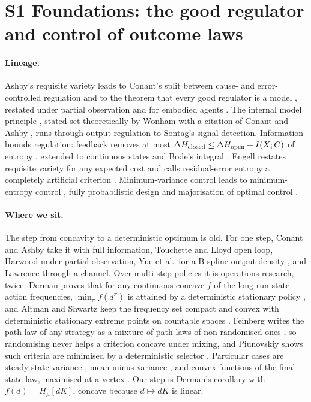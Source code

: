 \documentclass[10pt]{article}
\newcommand{\dpi}{d^\pi}
\begin{document}
\section{S1 Foundations: the good regulator and control of outcome laws}

\paragraph{Lineage.}
Ashby's requisite variety \citep{Ashby-introduction56} leads to Conant's split between cause- and error-controlled regulation \citep{Conant-information69} and to the theorem that every good regulator is a model \citep{Conant-good70}, restated under partial observation \citep{Wentworth-fixing21,Harwood-generalization25} and for embodied agents \citep{Virgo-good25}. The internal model principle \citep{Francis-internal76}, stated set-theoretically by Wonham with a citation of Conant and Ashby \citep{Wonham-towards76}, runs through output regulation to Sontag's signal detection. Information bounds regulation: feedback removes at most $\Delta H_{\rm closed}\le\Delta H_{\rm open}+I(X;C)$ of entropy \citep{Touchette-information00}, extended to continuous states \citep{Delvenne-towards13} and Bode's integral \citep{Martins-feedback08,Zhang-bode03}. Engell restates requisite variety for any expected cost and calls residual-error entropy a completely artificial criterion \citep{Engell-information85}. Minimum-variance control leads to minimum-entropy control \citep{Wang-minimum02}, fully probabilistic design \citep{Karny-fully06} and majorisation of optimal control \citep{Lefebvre-probabilistic24}.

\paragraph{Where we sit.}
The step from concavity to a deterministic optimum is old. For one step, Conant and Ashby take it with full information, Touchette and Lloyd open loop, Harwood under partial observation, Yue et al.\ for a B-spline output density \citep{Yue-minimum06}, and Lawrence through a channel. Over multi-step policies it is operations research, twice. Derman proves that for any continuous concave $f$ of the long-run state--action frequencies, $\min_\pi f(\dpi)$ is attained by a deterministic stationary policy \citep{Derman-finite70ch7}, and Altman and Shwartz keep the frequency set compact and convex with deterministic stationary extreme points on countable spaces \citep[Thm.~5.1]{Altman-markov91}. Feinberg writes the path law of any strategy as a mixture of path laws of non-randomised ones \citep[Thm.~1]{Feinberg-nonrandomized82}, so randomising never helps a criterion concave under mixing, and Piunovskiy shows such criteria are minimised by a deterministic selector \citep{Piunovskiy-controlled98}. Particular cases are steady-state variance \citep{Kawai-variance87,Sobel-meanvariance94,Xia-optimization16,Xia-global26}, mean minus variance \citep{Filar-variance89}, and convex functions of the final-state law, maximised at a vertex \citep{Collins-using97}. Our step is Derman's corollary with $f(d)=H_\mu[dK]$, concave because $d\mapsto dK$ is linear.
\end{document}
